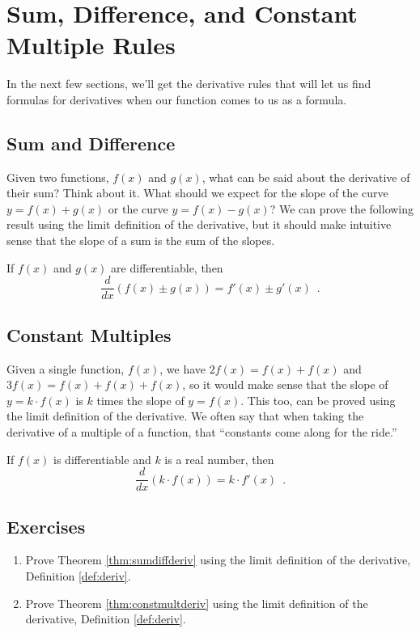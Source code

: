 \section{Sum, Difference, and Constant Multiple Rules}
\label{sec:power}

In the next few sections, we'll get the derivative rules that will let us find formulas for derivatives when our function comes to us as a formula. 

\subsection{Sum and Difference}
Given two functions, $f(x)$ and $g(x)$, what can be said about the derivative of their sum? Think about it. What should we expect for the slope of the curve $y = f(x)+g(x)$ or the curve $y=f(x) - g(x)$? We can prove the following result using the limit definition of the derivative, but it should make intuitive sense that the slope of a sum is the sum of the slopes.

\begin{theorem}
\label{thm:sumdiffderiv}
If $f(x)$ and $g(x)$ are differentiable, then 
    $$\dfrac{d}{dx}(f(x) \pm g(x))=f'(x) \pm g'(x) \enspace .$$
\end{theorem}

\subsection{Constant Multiples}
Given a single function, $f(x)$, we have $2f(x) = f(x) + f(x)$ and $3f(x) = f(x) + f(x) + f(x)$, so it would make sense that the slope of $y=k\cdot f(x)$ is $k$ times the slope of $y=f(x)$. This too, can be proved using the limit definition of the derivative. We often say that when taking the derivative of a multiple of a function, that ``constants come along for the ride.'' 

\begin{theorem}
\label{thm:constmultderiv}
If $f(x)$ is differentiable and $k$ is a real number, then
$$\dfrac{d}{dx}(k\cdot f(x))=k\cdot f'(x) \enspace .$$
\end{theorem}

\subsection{Exercises}
\begin{enumerate}
    \item Prove Theorem \ref{thm:sumdiffderiv} using the limit definition of the derivative, Definition \ref{def:deriv}.
    \item Prove Theorem \ref{thm:constmultderiv} using the limit definition of the derivative, Definition \ref{def:deriv}.
\end{enumerate}

